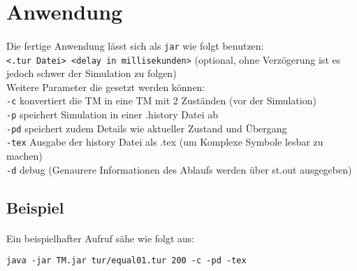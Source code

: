 \documentclass[10pt, a4paper]{article}
\newcommand{\ilc}{\texttt}
\begin{document}
\section*{Anwendung}
\paragraph*{}
Die fertige Anwendung lässt sich als \ilc{jar} wie folgt benutzen:\\
\ilc{<.tur Datei> <delay in millisekunden>} (optional, ohne Verzögerung ist es jedoch schwer der Simulation zu folgen)\\
\medskip
Weitere Parameter die gesetzt werden können:\\
\ilc{-c} konvertiert die TM in eine TM mit 2 Zuständen (vor der Simulation)\\
\ilc{-p} speichert Simulation in einer .history Datei ab\\
\ilc{-pd} speichert zudem Details wie aktueller Zustand und Übergang\\
\ilc{-tex} Ausgabe der history Datei als .tex (um Komplexe Symbole lesbar zu machen)\\
\ilc{-d} debug (Genaurere Informationen des Ablaufs werden über st.out ausgegeben)

\subsection*{Beispiel}
\paragraph*{}
Ein beispielhafter Aufruf sähe wie folgt aus:\par

\begin{tcolorbox}
\begin{verbatim}
java -jar TM.jar tur/equal01.tur 200 -c -pd -tex
\end{verbatim}
\end{tcolorbox}
\end{document}

